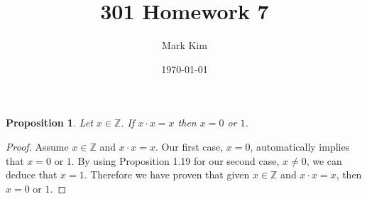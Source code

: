 \documentclass[12pt]{amsart}
\title{301 Homework 7}
\author{Mark Kim}
\date{\today}
\newcommand{\Z}{\mathbb{Z}}
\newtheorem*{proposition}{Proposition}
\begin{document}
\maketitle

\begin{proposition}
Let $x\in\Z$. If $x\cdot x=x$ then $x=0$ or $1$.
\end{proposition}

\begin{proof}
Assume $x\in\Z$ and $x\cdot x=x$.  Our first case, $x=0$, automatically implies that $x=0$ or $1$.  By using Proposition 1.19 for our second case, $x\neq 0$, we can deduce that $x=1$.  Therefore we have proven that given $x\in\Z$ and $x\cdot x=x$, then $x=0$ or $1$.
\end{proof}
\end{document}
